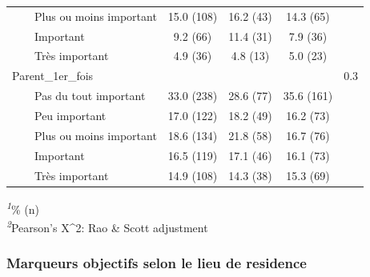 \documentclass[
]{article}
\begin{document}
\begin{table}[!t]
\begin{tabular*}{\linewidth}{@{\extracolsep{\fill}}lcccc}
    Plus ou moins important & 15.0 (108) & 16.2 (43) & 14.3 (65) &  \\ 
    Important & 9.2 (66) & 11.4 (31) & 7.9 (36) &  \\ 
    Très important & 4.9 (36) & 4.8 (13) & 5.0 (23) &  \\ 
Parent\_1er\_fois &  &  &  & 0.3 \\ 
    Pas du tout important & 33.0 (238) & 28.6 (77) & 35.6 (161) &  \\ 
    Peu important & 17.0 (122) & 18.2 (49) & 16.2 (73) &  \\ 
    Plus ou moins important & 18.6 (134) & 21.8 (58) & 16.7 (76) &  \\ 
    Important & 16.5 (119) & 17.1 (46) & 16.1 (73) &  \\ 
    Très important & 14.9 (108) & 14.3 (38) & 15.3 (69) &  \\ 
\bottomrule
\end{tabular*}
\begin{minipage}{\linewidth}
\textsuperscript{\textit{1}}\% (n)\\
\textsuperscript{\textit{2}}Pearson's X\^{}2: Rao \& Scott adjustment\\
\end{minipage}
\end{table}

\hypertarget{marqueurs-objectifs-selon-le-lieu-de-residence}{%
\subsubsection{Marqueurs objectifs selon le lieu de
residence}\label{marqueurs-objectifs-selon-le-lieu-de-residence}}
\end{document}
